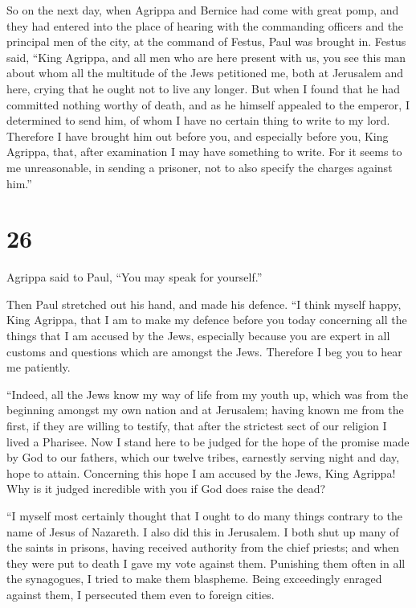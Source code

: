  So on the next day, when Agrippa and Bernice had come with
great pomp, and they had entered into the place of hearing with the
commanding officers and the principal men of the city, at the command of
Festus, Paul was brought in.  Festus said, ``King Agrippa,
and all men who are here present with us, you see this man about whom
all the multitude of the Jews petitioned me, both at Jerusalem and here,
crying that he ought not to live any longer.  But when I
found that he had committed nothing worthy of death, and as he himself
appealed to the emperor, I determined to send him,  of whom
I have no certain thing to write to my lord. Therefore I have brought
him out before you, and especially before you, King Agrippa, that, after
examination I may have something to write.  For it seems to
me unreasonable, in sending a prisoner, not to also specify the charges
against him.''

\hypertarget{section-25}{%
\section{26}\label{section-25}}

 Agrippa said to Paul, ``You may speak for yourself.''

Then Paul stretched out his hand, and made his defence.  ``I
think myself happy, King Agrippa, that I am to make my defence before
you today concerning all the things that I am accused by the Jews,
 especially because you are expert in all customs and
questions which are amongst the Jews. Therefore I beg you to hear me
patiently.

 ``Indeed, all the Jews know my way of life from my youth
up, which was from the beginning amongst my own nation and at Jerusalem;
 having known me from the first, if they are willing to
testify, that after the strictest sect of our religion I lived a
Pharisee.  Now I stand here to be judged for the hope of the
promise made by God to our fathers,  which our twelve
tribes, earnestly serving night and day, hope to attain. Concerning this
hope I am accused by the Jews, King Agrippa!  Why is it
judged incredible with you if God does raise the dead?

 ``I myself most certainly thought that I ought to do many
things contrary to the name of Jesus of Nazareth.  I also
did this in Jerusalem. I both shut up many of the saints in prisons,
having received authority from the chief priests; and when they were put
to death I gave my vote against them.  Punishing them often
in all the synagogues, I tried to make them blaspheme. Being exceedingly
enraged against them, I persecuted them even to foreign cities.

